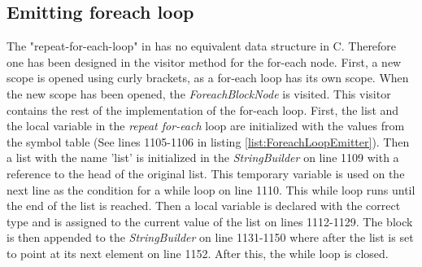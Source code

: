 \subsection{Emitting foreach loop} \label{for each impl}
The "repeat-for-each-loop" in \lang has no equivalent data structure in C. Therefore one has been designed in the visitor method for the for-each node. First, a new scope is opened using curly brackets, as a for-each loop has its own scope. When the new scope has been opened, the \textit{ForeachBlockNode} is visited. This visitor contains the rest of the implementation of the for-each loop. First, the list and the local variable in the \textit{repeat for-each} loop are initialized with the values from the symbol table (See lines 1105-1106 in listing \ref{list:ForeachLoopEmitter}). Then a list with the name 'list' is initialized in the \textit{StringBuilder} on line 1109 with a reference to the head of the original list. This temporary variable is used on the next line as the condition for a while loop on line 1110. This while loop runs until the end of the list is reached. Then a local variable is declared with the correct type and is assigned to the current value of the list on lines 1112-1129. The block is then appended to the \textit{StringBuilder} on line 1131-1150 where after the list is set to point at its next element on line 1152. After this, the while loop is closed.

